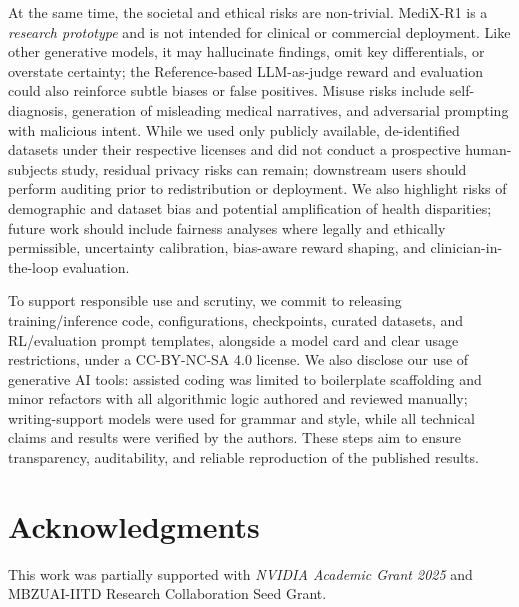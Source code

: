 \documentclass{article}
\theoremstyle{plain}
\theoremstyle{definition}
\theoremstyle{remark}
\begin{document}
At the same time, the societal and ethical risks are non-trivial. MediX-R1 is a \emph{research prototype} and is not intended for clinical or commercial deployment. Like other generative models, it may hallucinate findings, omit key differentials, or overstate certainty; the Reference-based LLM-as-judge reward and evaluation could also reinforce subtle biases or false positives. Misuse risks include self-diagnosis, generation of misleading medical narratives, and adversarial prompting with malicious intent. While we used only publicly available, de-identified datasets under their respective licenses and did not conduct a prospective human-subjects study, residual privacy risks can remain; downstream users should perform auditing prior to redistribution or deployment. We also highlight risks of demographic and dataset bias and potential amplification of health disparities; future work should include fairness analyses where legally and ethically permissible, uncertainty calibration, bias-aware reward shaping, and clinician-in-the-loop evaluation.

To support responsible use and scrutiny, we commit to releasing training/inference code, configurations, checkpoints, curated datasets, and RL/evaluation prompt templates, alongside a model card and clear usage restrictions, under a CC-BY-NC-SA 4.0 license. We also disclose our use of generative AI tools: assisted coding was limited to boilerplate scaffolding and minor refactors with all algorithmic logic authored and reviewed manually; writing-support models were used for grammar and style, while all technical claims and results were verified by the authors. These steps aim to ensure transparency, auditability, and reliable reproduction of the published results.

\section*{Acknowledgments}
This work was partially supported with  \textit{NVIDIA Academic Grant 2025} and MBZUAI-IITD Research Collaboration Seed Grant. 






\newpage
\appendix
\onecolumn
\end{document}
